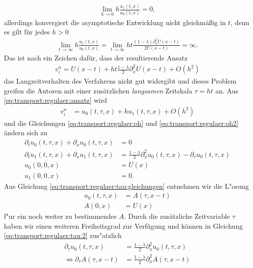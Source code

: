 \begin{align*}
\lim_{h \to 0} h \frac{u_1(t,x)}{u_0(t,x)} = 0,
\end{align*}
allerdings konvergiert die asymptotische Entwicklung nicht gleichmäßig in $t$, denn es gilt für jedes $h > 0$
\begin{align*}
\lim_{t \to \infty} h \frac{u_1(t,x)}{u_0(t,x)} = \lim_{t \to \infty} h t \frac{(1-\lambda) \partial^2_x U(x-t) }{2 U(x-t)} = \infty.
\end{align*}
Das ist nach \cite{Junk2004} ein Zeichen dafür, dass der resultierende Ansatz
\begin{align}\label{eq:transport:regulaer:ansatz:ergebnis}
v^n_i = U(x-t) + h t \frac{1-\lambda}{2} \partial^2_x U(x-t) + O(h^2)
\end{align}
das Langzeitverhalten des Verfahrens nicht gut widergibt und dieses Problem greifen die Autoren mit einer zusätzlichen \emph{langsamen} Zeitskala $\tau = h t$ an.
Aus \eqref{eq:transport:regulaer:ansatz} wird
\begin{align}\label{eq:transport:regulaer:tau:ansatz}
v^n_i &= u_0(t, \tau, x) + h u_1(t, \tau, x) + O(h^2)
\end{align}
und die Gleichungen \eqref{eq:transport:regulaer:oh} und \eqref{eq:transport:regulaer:oh2} ändern sich zu
\begin{align}
\label{eq:transport:regulaer:tau:gleichungen}
\partial_t u_0(t,\tau,x) + \partial_x u_0(t,\tau,x) &= 0\\
\label{eq:transport:regulaer:tau:2}
\partial_t u_1(t,\tau,x) + \partial_x u_1(t,\tau,x) &= \frac{1-\lambda}{2} \partial^2_x u_0(t,\tau,x) - \partial_\tau u_0(t,\tau,x)\\
u_0(0, 0, x) &= U(x)\\
u_1(0, 0, x) &= 0.
\end{align}
Aus Gleichung \eqref{eq:transport:regulaer:tau:gleichungen} entnehmen wir die L"osung
\begin{align}
u_0(t, \tau, x) &= A(\tau, x-t)\\
A(0, x) &= U(x)
\end{align}
f"ur ein noch weiter zu bestimmendes $A$.
Durch die zusätzliche Zeitvariable $\tau$ haben wir einen weiteren Freiheitsgrad zur Verfügung und können in Gleichung \eqref{eq:transport:regulaer:tau:2} zus"atzlich
\begin{align}\label{eq:transport:regulaer:waermeleit}
\partial_\tau u_0(t,\tau,x) &= \frac{1-\lambda}{2} \partial^2_x u_0(t,\tau,x)\\
\Leftrightarrow \partial_\tau A(\tau, x-t) &= \frac{1-\lambda}{2} \partial^2_x A(\tau,x-t)
\end{align}
